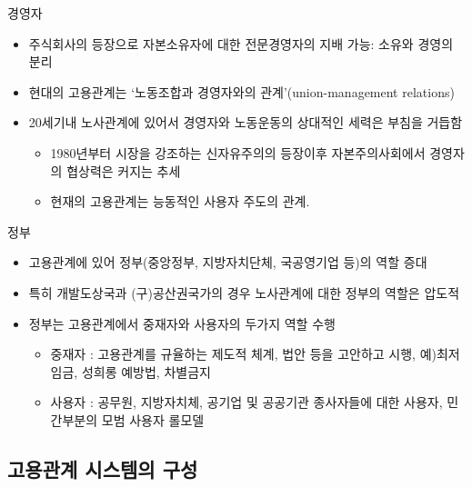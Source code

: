 \documentclass[aspectratio=169,xcolor=dvipsnames,handout]{beamer}
\begin{document}
\begin{frame}{경영자}
    \begin{itemize}
        \item 주식회사의 등장으로 자본소유자에 대한 전문경영자의 지배 가능: 소유와 경영의 분리
        \item 현대의 고용관계는 ‘노동조합과 경영자와의 관계’(union-management relations)
        \item 20세기내 노사관계에 있어서 경영자와 노동운동의 상대적인 세력은 부침을 거듭함
        \begin{itemize}
            \item 1980년부터 시장을 강조하는 신자유주의의 등장이후 자본주의사회에서 경영자의 협상력은 커지는 추세 
            \item 현재의 고용관계는 능동적인 사용자 주도의 관계.
        \end{itemize}
    \end{itemize}
\end{frame}

\begin{frame}{정부}
    \begin{itemize}
        \item 고용관계에 있어 정부(중앙정부, 지방자치단체, 국공영기업 등)의 역할 증대
        \item 특히 개발도상국과 (구)공산권국가의 경우 노사관계에 대한 정부의 역할은 압도적
        \item 정부는 고용관계에서 중재자와 사용자의 두가지 역할 수행
        \begin{itemize}
            \item 중재자 : 고용관계를 규율하는 제도적 체계, 법안 등을 고안하고 시행, 예)최저임금, 성희롱 예방법, 차별금지
            \item 사용자 : 공무원, 지방자치체, 공기업 및 공공기관 종사자들에 대한 사용자, 민간부분의 모범 사용자 롤모델
        \end{itemize}
    \end{itemize}
    
\end{frame}

\subsection{고용관계 시스템의 구성}
\end{document}
